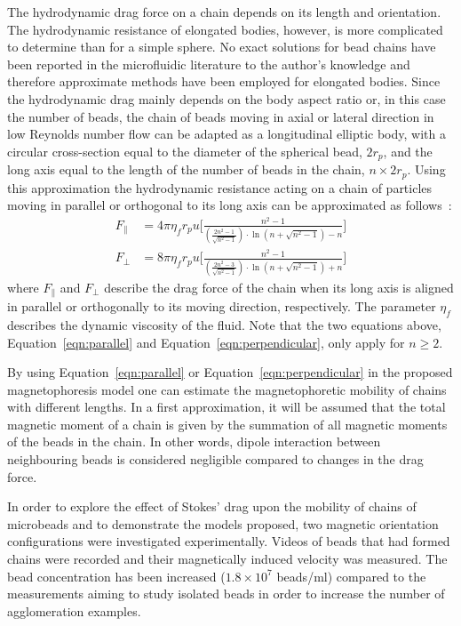 The hydrodynamic drag force on a chain depends on its length and orientation. The hydrodynamic resistance of elongated bodies, however, is more complicated to determine than for a simple sphere. No exact solutions for bead chains have been reported in the microfluidic literature to the author's knowledge and therefore approximate methods have been employed for elongated bodies. Since the hydrodynamic drag mainly depends on the body aspect ratio or, in this case the number of beads, the chain of beads moving in axial or lateral direction in low Reynolds number flow can be adapted as a longitudinal elliptic body, with a circular cross-section equal to the diameter of the spherical bead, $2r_{p}$, and the long axis equal to the length of the number of beads in the chain, $n \times 2r_{p}$. Using this approximation the hydrodynamic resistance acting on a chain of particles moving in parallel or orthogonal to its long axis can be approximated as follows~\cite{Happel2012,Kasper1985}:
\begin{align}
	F_{\|} &= 4\pi\eta_{f} r_{p} u \Biggl[ \frac{n^{2}-1}{\left(\frac{2n^{2}-1}{\sqrt{n^{2}-1}}\right) \cdot \ln \left( n + \sqrt{n^{2}-1}\right)-n} \Biggr] \label{eqn:parallel}\\
	F_{\bot} &= 8\pi\eta_{f} r_{p} u \Biggl[ \frac{n^{2}-1}{\left(\frac{2n^{2}-3}{\sqrt{n^{2}-1}}\right)\cdot \ln \left( n + \sqrt{n^{2}-1}\right)+n} \Biggr] \label{eqn:perpendicular}
\end{align}
where $F_{\|}$ and $F_{\bot}$ describe the drag force of the chain when its long axis is aligned in parallel or orthogonally to its moving direction, respectively. The parameter $\eta_{f}$ describes the dynamic viscosity of the fluid. Note that the two equations above, Equation~\ref{eqn:parallel} and Equation~\ref{eqn:perpendicular}, only apply for $n \geq 2$.

By using Equation~\ref{eqn:parallel} or Equation~\ref{eqn:perpendicular} in the proposed magnetophoresis model one can estimate the magnetophoretic mobility of chains with different lengths. In a first approximation, it will be assumed that the total magnetic moment of a chain is given by the summation of all magnetic moments of the beads in the chain. In other words, dipole interaction between neighbouring beads is considered negligible compared to changes in the drag force.

In order to explore the effect of Stokes' drag upon the mobility of chains of microbeads and to demonstrate the models proposed, two magnetic orientation configurations were investigated experimentally. Videos of beads that had formed chains were recorded and their magnetically induced velocity was measured. The bead concentration has been increased ($1.8\times 10^{7}$ beads/ml) compared to the measurements aiming to study isolated beads in order to increase the number of agglomeration examples. 

